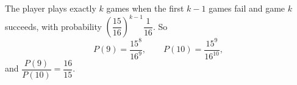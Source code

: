 The player plays exactly $k$ games when the first $k-1$ games fail and game $k$ succeeds, with probability $\left(\dfrac{15}{16}\right)^{k-1}\dfrac1{16}$. So
\[P(9)=\dfrac{15^8}{16^9},\qquad P(10)=\dfrac{15^9}{16^{10}},\]
and $\dfrac{P(9)}{P(10)}=\boxed{\dfrac{16}{15}}$.
